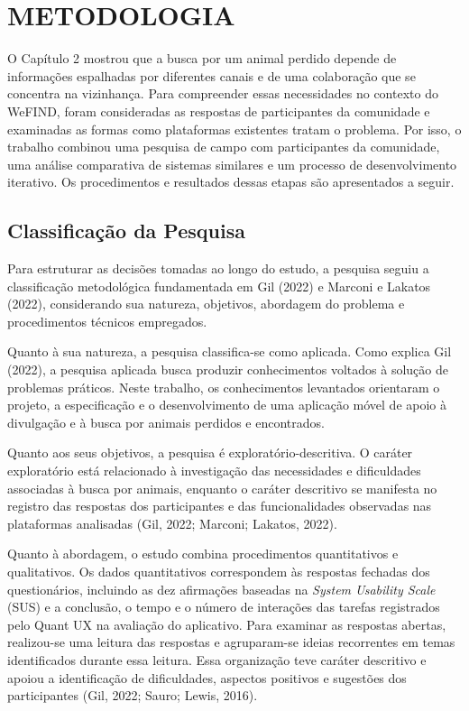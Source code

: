 \section{METODOLOGIA}

O Capítulo 2 mostrou que a busca por um animal perdido depende de informações espalhadas por diferentes canais e de uma colaboração que se concentra na vizinhança. Para compreender essas necessidades no contexto do WeFIND, foram consideradas as respostas de participantes da comunidade e examinadas as formas como plataformas existentes tratam o problema. Por isso, o trabalho combinou uma pesquisa de campo com participantes da comunidade, uma análise comparativa de sistemas similares e um processo de desenvolvimento iterativo. Os procedimentos e resultados dessas etapas são apresentados a seguir.

\subsection{Classificação da Pesquisa}

Para estruturar as decisões tomadas ao longo do estudo, a pesquisa seguiu a classificação metodológica fundamentada em Gil (2022) e Marconi e Lakatos (2022), considerando sua natureza, objetivos, abordagem do problema e procedimentos técnicos empregados.

Quanto à sua natureza, a pesquisa classifica-se como aplicada. Como explica Gil (2022), a pesquisa aplicada busca produzir conhecimentos voltados à solução de problemas práticos. Neste trabalho, os conhecimentos levantados orientaram o projeto, a especificação e o desenvolvimento de uma aplicação móvel de apoio à divulgação e à busca por animais perdidos e encontrados.

Quanto aos seus objetivos, a pesquisa é exploratório-descritiva. O caráter exploratório está relacionado à investigação das necessidades e dificuldades associadas à busca por animais, enquanto o caráter descritivo se manifesta no registro das respostas dos participantes e das funcionalidades observadas nas plataformas analisadas (Gil, 2022; Marconi; Lakatos, 2022).

Quanto à abordagem, o estudo combina procedimentos quantitativos e qualitativos. Os dados quantitativos correspondem às respostas fechadas dos questionários, incluindo as dez afirmações baseadas na \textit{System Usability Scale} (SUS) e a conclusão, o tempo e o número de interações das tarefas registrados pelo Quant UX na avaliação do aplicativo. Para examinar as respostas abertas, realizou-se uma leitura das respostas e agruparam-se ideias recorrentes em temas identificados durante essa leitura. Essa organização teve caráter descritivo e apoiou a identificação de dificuldades, aspectos positivos e sugestões dos participantes (Gil, 2022; Sauro; Lewis, 2016).

